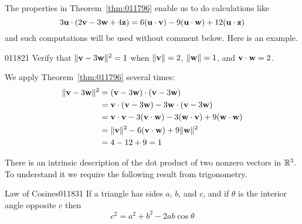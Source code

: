 The properties in Theorem~\ref{thm:011796} enable us to do calculations like
\begin{equation*}
3\textbf{u} \cdot (2\textbf{v} - 3\textbf{w} + 4\textbf{z}) = 6(\textbf{u} \cdot \textbf{v}) - 9(\textbf{u} \cdot \textbf{w}) + 12(\textbf{u} \cdot \textbf{z})
\end{equation*}
and such computations will be used without comment below. Here is an example.


\begin{example}{}{011821}
Verify that $\|\textbf{v} -3\textbf{w}\|^{2} = 1$ when $\|\textbf{v}\| = 2$, $\|\textbf{w}\| = 1$, and $\textbf{v} \cdot \textbf{w} = 2$.


\begin{solution}
  We apply Theorem~\ref{thm:011796} several times:
\begin{align*}
\| \textbf{v} - 3\textbf{w} \|^2 &= (\textbf{v} - 3\textbf{w}) \cdot (\textbf{v} - 3\textbf{w}) \\
		&= \textbf{v} \cdot (\textbf{v} - 3\textbf{w}) - 3\textbf{w} \cdot (\textbf{v} - 3\textbf{w}) \\
		&= \textbf{v} \cdot \textbf{v} - 3(\textbf{v} \cdot \textbf{w}) - 3(\textbf{w} \cdot \textbf{v}) + 9(\textbf{w} \cdot \textbf{w}) \\
		&=\| \textbf{v} \|^2 - 6(\textbf{v} \cdot \textbf{w}) + 9\| \textbf{w} \|^2 \\
		&= 4 - 12 + 9 = 1 
\end{align*}
\end{solution}
\end{example}

There is an intrinsic description of the dot product of two nonzero vectors in $\mathbb{R}^3$. To understand it we require the following result from trigonometry.


\begin{theorem*}{Law of Cosines}{011831}
If a triangle has sides $a$, $b$, and $c$, and if $\theta$ is the interior angle opposite $c$ then
\begin{equation*}
c^2 = a^2 + b^2 -2ab \cos\theta
\end{equation*}
\end{theorem*}

\begin{wrapfigure}[7]{l}{5cm} 
\centering

\caption{\label{fig:011840}}
\end{wrapfigure}

